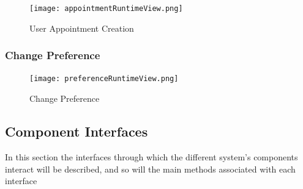 \documentclass[12pt]{article}
\begin{document}
\begin{figure}[H]
    \centering
    \texttt{[image: appointmentRuntimeView.png]}
    \caption{User Appointment Creation}
    \label{fig:appointmentRuntime}
\end{figure}

\subsubsection{Change Preference}

\begin{figure}[H]
    \centering
    \texttt{[image: preferenceRuntimeView.png]}
    \caption{Change Preference}
    \label{fig:preferenceRuntime}
\end{figure}

\subsection{Component Interfaces}
In this section the interfaces through which the different system's components interact will be described, and so will the main methods associated with each interface
\end{document}
